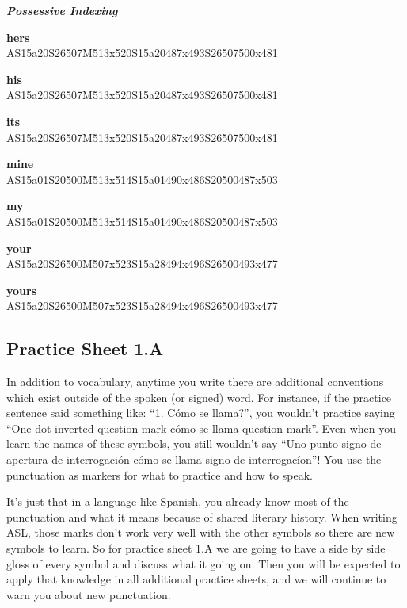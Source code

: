 \documentclass{article}
\begin{document}
\begin{glossary}
\textbf{\emph{Possessive Indexing}}

\textbf{hers}\\
AS15a20S26507M513x520S15a20487x493S26507500x481

\textbf{his}\\
AS15a20S26507M513x520S15a20487x493S26507500x481

\textbf{its}\\
AS15a20S26507M513x520S15a20487x493S26507500x481

\textbf{mine}\\
AS15a01S20500M513x514S15a01490x486S20500487x503

\textbf{my}\\
AS15a01S20500M513x514S15a01490x486S20500487x503

\textbf{your}\\
AS15a20S26500M507x523S15a28494x496S26500493x477

\textbf{yours}\\
AS15a20S26500M507x523S15a28494x496S26500493x477

\end{glossary}

\subsection{Practice Sheet 1.A}

In addition to vocabulary, anytime you write there are additional conventions which exist outside of the spoken (or signed) word.
For instance, if the practice sentence said something like: ``1. \textquestiondown C\'omo se llama?'', you wouldn't practice saying ``One dot inverted question mark c\'omo se llama question mark''.
Even when you learn the names of these symbols, you still wouldn't say ``Uno punto signo de apertura de interrogaci\'on c\'omo se llama signo de interrogac\'ion''!
You use the punctuation as markers for what to practice and how to speak.

It's just that in a language like Spanish, you already know most of the punctuation and what it means because of shared literary history.
When writing ASL, those marks don't work very well with the other symbols so there are new symbols to learn.
So for practice sheet 1.A we are going to have a side by side gloss of every symbol and discuss what it going on.
Then you will be expected to apply that knowledge in all additional practice sheets, and we will continue to warn you about new punctuation.
\end{document}

